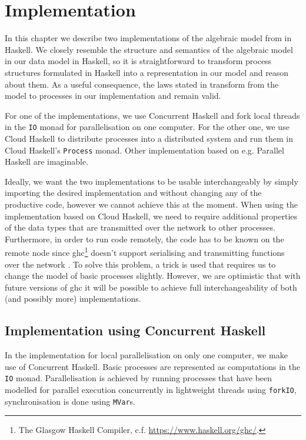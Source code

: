 \chapter{Implementation}
\label{chp:implementation}
In this chapter we describe two implementations of the algebraic model from  in \textsf{Haskell}. We closely resemble the structure and semantics of the algebraic model in our data model in \textsf{Haskell}, so it is straightforward to transform process structures formulated in \textsf{Haskell} into a representation in our model and reason about them. As a useful consequence, the laws stated in  transform from the model to processes in our implementation and remain valid.

For one of the implementations, we use \textsf{Concurrent Haskell} and fork local threads in the \texttt{IO} monad for parallelisation on one computer. For the other one, we use \textsf{Cloud Haskell} to distribute processes into a distributed system and run them in \textsf{Cloud Haskell}'s \texttt{Process} monad. Other implementation based on e.g. \textsf{Parallel Haskell} are imaginable.

Ideally, we want the two implementations to be usable interchangeably by simply importing the desired implementation and without changing any of the productive code, however we cannot achieve this at the moment. When using the implementation based on \textsf{Cloud Haskell}, we need to require additional properties of the data types that are transmitted over the network to other processes. Furthermore, in order to run code remotely, the code has to be known on the remote node since \textsf{ghc}\footnote{The Glasgow Haskell Compiler, c.f. \url{https://www.haskell.org/ghc/}.} doesn't support serialising and transmitting functions over the network \cite{Epstein:2011:THC:2034675.2034690}. To solve this problem, a trick is used that requires us to change the model of basic processes slightly. However, we are optimistic that with future versions of \textsf{ghc} it will be possible to achieve full interchangeability of both (and possibly more) implementations.



\clearpage

\section{Implementation using Concurrent Haskell}
\label{chp:local}
In the implementation for local parallelisation on only one computer, we make use of \textsf{Concurrent Haskell}. Basic processes are represented as computations in the \texttt{IO} monad. Parallelisation is achieved by running processes that have been modelled for parallel execution concurrently in lightweight threads using \texttt{forkIO}, synchronisation is done using \texttt{MVar}s.

